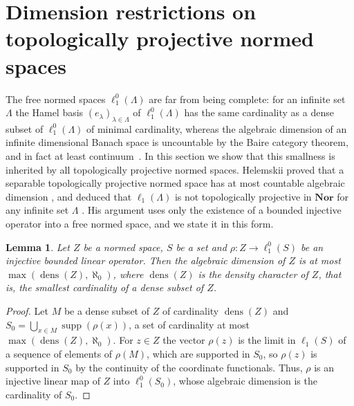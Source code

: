 \documentclass[12pt]{article}
\newtheorem{lemma}[theorem]{Lemma}
\newcommand{\Nor}{\mathbf{Nor}}
\newcommand{\lo}[1]{\ell_1^0(#1)}
\newcommand{\ellone}[1]{\ell_1(#1)}
\newcommand{\supp}{\operatorname{supp}}
\begin{document}

\section{Dimension restrictions on topologically projective normed
  spaces}\label{SectionNecessaryConditions}

The free normed spaces $\lo{\Lambda}$ are far from being complete: for an
infinite set $\Lambda$ the Hamel basis ${(e_\lambda)}_{\lambda\in\Lambda}$ of
$\lo{\Lambda}$ has the same cardinality as a dense subset of $\lo{\Lambda}$
of minimal cardinality, whereas the algebraic dimension of an infinite
dimensional Banach space is uncountable by the Baire category theorem, and in
fact at least continuum~\cite{LowigDimLinRaume}. In this section we show that
this smallness is inherited by all topologically projective normed spaces.
Helemskii proved that a separable topologically projective normed space has at
most countable algebraic dimension \cite[proposition 2.4]{HelExtrProjSeqAlg},
and deduced that $\ellone{\Lambda}$ is not topologically projective in $\Nor$
for any infinite set $\Lambda$ \cite[proposition 2.5]{HelExtrProjSeqAlg}. His
argument uses only the existence of a bounded injective operator into a free
normed space, and we state it in this form.

\begin{lemma}\label{InjectionDimension} Let $Z$ be a normed space, $S$ be a
    set and $\rho:Z\to\lo{S}$ be an injective bounded linear operator. Then
    the algebraic dimension of $Z$ is at most $\max(\operatorname{dens}(Z),\aleph_0)$,
    where $\operatorname{dens}(Z)$ is the density character of $Z$, that is,
    the smallest cardinality of a dense subset of $Z$.
\end{lemma}
\begin{proof} Let $M$ be a dense subset of $Z$ of cardinality
    $\operatorname{dens}(Z)$ and $S_0=\bigcup_{x\in M}\supp(\rho(x))$, a set
    of cardinality at most $\max(\operatorname{dens}(Z),\aleph_0)$. For
    $z\in Z$ the vector $\rho(z)$ is the limit in $\ellone{S}$ of a sequence
    of elements of $\rho(M)$, which are supported in $S_0$, so $\rho(z)$ is
    supported in $S_0$ by the continuity of the coordinate functionals. Thus,
    $\rho$ is an injective linear map of $Z$ into $\lo{S_0}$, whose algebraic
    dimension is the cardinality of $S_0$.
\end{proof}
\end{document}
